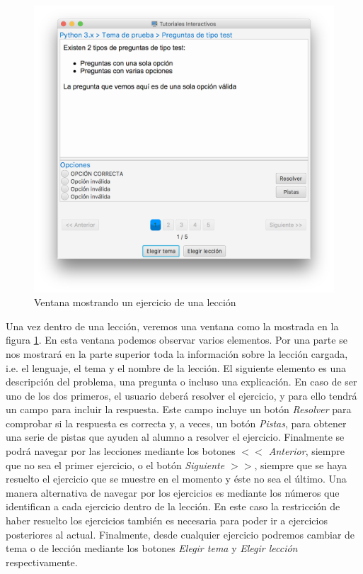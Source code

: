 \documentclass[]{article}
\begin{document}
%
\begin{figure}[tbp]
\begin{center}
\includegraphics[scale=0.35,trim={50px 50px 50px 30px},clip]{l_3.png}
\end{center}
\caption{Ventana mostrando un ejercicio de una lección\label{fig:l_3}}
\end{figure}
%

Una vez dentro de una lección, veremos una ventana como la mostrada en la figura \ref{fig:l_3}. En esta ventana podemos observar varios elementos. Por una parte se nos mostrará en la parte superior toda la información sobre la lección cargada, i.e. el lenguaje, el tema y el nombre de la lección. El siguiente elemento es una descripción del problema, una pregunta o incluso una explicación. En caso de ser uno de los dos primeros, el usuario deberá resolver el ejercicio, y para ello tendrá un campo para incluir la respuesta. Este campo incluye un botón \emph{Resolver} para comprobar si la respuesta es correcta y, a veces, un botón \emph{Pistas}, para obtener una serie de pistas que ayuden al alumno a resolver el ejercicio. Finalmente se podrá navegar por las lecciones mediante los botones \emph{$<<$ Anterior}, siempre que no sea el primer ejercicio, o el botón \emph{Siguiente $>>$}, siempre que se haya resuelto el ejercicio que se muestre en el momento y éste no sea el último. Una manera alternativa de navegar por los ejercicios es mediante los números que identifican a cada ejercicio dentro de la lección. En este caso la restricción de haber resuelto los ejercicios también es necesaria para poder ir a ejercicios posteriores al actual. Finalmente, desde cualquier ejercicio podremos cambiar de tema o de lección mediante los botones \emph{Elegir tema} y \emph{Elegir lección} respectivamente.  
\end{document}
